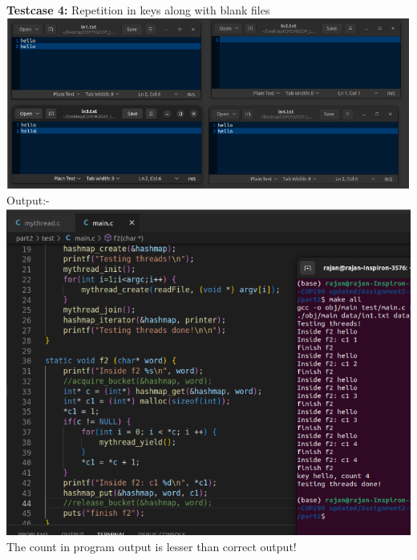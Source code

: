 \documentclass[12pt]{article}
\begin{document}
\begin{spacing}{1.2}
\textbf{Testcase 4:} Repetition in keys along with blank files\\
\includegraphics[width=14cm]{images/24.png}\\
Output:-\\
\includegraphics[width=14cm]{images/25.png}\\
The count in program output is lesser than correct output!\\
    \newpage


\end{spacing}
\end{document}

